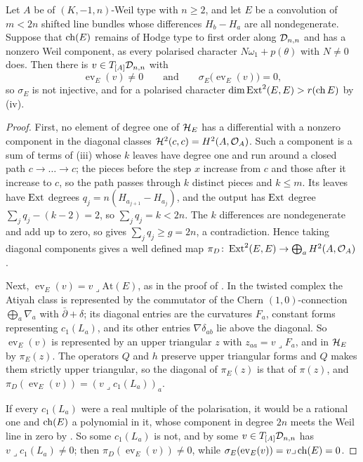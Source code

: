 \begin{theorem}\label{thm:fewpieces}
Let $A$ be of $(K,-1,n)$-Weil type with $n\ge2$, and let $E$ be a
convolution of $m<2n$ shifted line bundles whose differences $H_{b}-H_{a}$
are all nondegenerate. Suppose that $\operatorname{ch}(E)$ remains of Hodge type to first
order along $\mathcal{D}_{n,n}$ and has a nonzero Weil component, as every polarised
character $N\omega_{1}+p(\theta)$ with $N\ne0$ does. Then there is
$v\in T_{[A]}\mathcal{D}_{n,n}$ with
\[
  \operatorname{ev}_{E}(v)\ne0
  \qquad\text{and}\qquad
  \sigma_{E}\bigl(\operatorname{ev}_{E}(v)\bigr)=0 ,
\]
so $\sigma_{E}$ is not injective, and for a polarised character
$\dim\operatorname{Ext}^{2}(E,E)>r(\operatorname{ch} E)$ by (iv).
\end{theorem}

\begin{proof}
First, no element of degree one of $\mathcal{H}_{E}$ has a differential with a
nonzero component in the diagonal classes $\mathcal{H}^{2}(c,c)=H^{2}(A,\mathcal{O}_{A})$.
Such a component is a sum of terms of (iii) whose
$k$ leaves have degree one and run around a closed path $c\to\dots\to c$; the
pieces before the step $x$ increase from $c$ and those after it increase to
$c$, so the path passes through $k$ distinct pieces and $k\le m$. Its
leaves have $\operatorname{Ext}$ degrees $q_{j}=n(H_{a_{j+1}}-H_{a_{j}})$, and the output
has $\operatorname{Ext}$ degree $\sum_{j}q_{j}-(k-2)=2$, so $\sum_{j}q_{j}=k<2n$. The $k$
differences are nondegenerate and add up to zero, so 
gives $\sum_{j}q_{j}\ge g=2n$, a contradiction. Hence taking diagonal
components gives a well defined map
$\pi_{D}\colon\operatorname{Ext}^{2}(E,E)\to\bigoplus_{a}H^{2}(A,\mathcal{O}_{A})$.

Next, $\operatorname{ev}_{E}(v)=v\lrcorner\mathrm{At}(E)$, as in the proof
of \cite[Theorem~9.20]{paperI}. In the twisted complex the Atiyah class is
represented by the commutator of the Chern $(1,0)$-connection
$\bigoplus_{a}\nabla_{a}$ with $\bar\partial+\delta$; its diagonal entries
are the curvatures $F_{a}$, constant forms representing $c_{1}(L_{a})$, and
its other entries $\nabla\delta_{ab}$ lie above the diagonal. So
$\operatorname{ev}_{E}(v)$ is represented by an upper triangular $z$ with
$z_{aa}=v\lrcorner F_{a}$, and in $\mathcal{H}_{E}$ by $\pi_{E}(z)$. The operators
$Q$ and $h$ preserve upper triangular forms and $Q$ makes them strictly upper
triangular, so the diagonal of $\pi_{E}(z)$ is that of $\pi(z)$, and
$\pi_{D}(\operatorname{ev}_{E}(v))=(v\lrcorner c_{1}(L_{a}))_{a}$.

If every $c_{1}(L_{a})$ were a real multiple of the polarisation, it would
be a rational one and $\operatorname{ch}(E)$ a polynomial in it, whose component in degree
$2n$ meets the Weil line in zero by \cite[Proposition~5.1]{paperI}. So some
$c_{1}(L_{a})$ is not, and by \cite[Proposition~9.15(i)]{paperI} some
$v\in T_{[A]}\mathcal{D}_{n,n}$ has $v\lrcorner c_{1}(L_{a})\ne0$; then
$\pi_{D}(\operatorname{ev}_{E}(v))\ne0$, while
$\sigma_{E}(\operatorname{ev}_{E}(v))=v\lrcorner\operatorname{ch}(E)=0$.
\end{proof}

